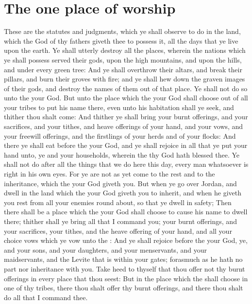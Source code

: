 \section*{The one place of worship}
\begin{biblechapter} %
\verse These are the statutes and judgments, which ye shall observe to do in the land, which the \LORD God of thy fathers giveth thee to possess it, all the days that ye live upon the earth.
\verse Ye shall utterly destroy all the places, wherein the nations which ye shall possess served their gods, upon the high mountains, and upon the hills, and under every green tree:
\verse And ye shall overthrow their altars, and break their pillars, and burn their groves with fire; and ye shall hew down the graven images of their gods, and destroy the names of them out of that place.
\verse Ye shall not do so unto the \LORD your God.
\verse But unto the place which the \LORD your God shall choose out of all your tribes to put his name there, even unto his habitation shall ye seek, and thither thou shalt come:
\verse And thither ye shall bring your burnt offerings, and your sacrifices, and your tithes, and heave offerings of your hand, and your vows, and your freewill offerings, and the firstlings of your herds and of your flocks:
\verse And there ye shall eat before the \LORD your God, and ye shall rejoice in all that ye put your hand unto, ye and your households, wherein the \LORD thy God hath blessed thee.
\verse Ye shall not do after all the things that we do here this day, every man whatsoever is right in his own eyes.
\verse For ye are not as yet come to the rest and to the inheritance, which the \LORD your God giveth you.
\verse But when ye go over Jordan, and dwell in the land which the \LORD your God giveth you to inherit, and when he giveth you rest from all your enemies round about, so that ye dwell in safety;
\verse Then there shall be a place which the \LORD your God shall choose to cause his name to dwell there; thither shall ye bring all that I command you; your burnt offerings, and your sacrifices, your tithes, and the heave offering of your hand, and all your choice vows which ye vow unto the \LORD:
\verse And ye shall rejoice before the \LORD your God, ye, and your sons, and your daughters, and your menservants, and your maidservants, and the Levite that is within your gates; forasmuch as he hath no part nor inheritance with you.
\verse Take heed to thyself that thou offer not thy burnt offerings in every place that thou seest:
\verse But in the place which the \LORD shall choose in one of thy tribes, there thou shalt offer thy burnt offerings, and there thou shalt do all that I command thee.

\end{biblechapter}
